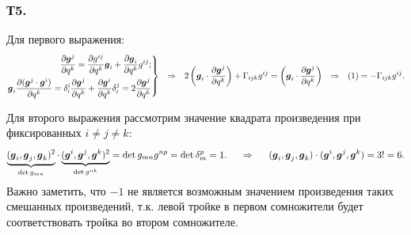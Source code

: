 \subsubsection*{Т5.}
Для первого выражения:
\begin{equation}
    \left.\begin{aligned}
        \frac{\partial \mbox{\boldmath $g$}^j}{\partial q^k} = \frac{\partial g^{ij}}{\partial q^k} \mbox{\boldmath $g$}_i + \frac{\partial \mbox{\boldmath $g$}_i}{\partial q^k} g^{ij}; \\ 
        \mbox{\boldmath $g$}_i \frac{\partial (\mbox{\boldmath $g$}^j \cdot \mbox{\boldmath $g$}^i)}{\partial q^k} = 
        \delta_i^i \frac{\partial \mbox{\boldmath $g$}^j}{\partial q^k} + \frac{\partial \mbox{\boldmath $g$}^i}{\partial q^k} \delta_i^j
        = 
        2 \frac{\partial \mbox{\boldmath $g$}^j}{\partial q^k}
    \end{aligned}\right\}
    \hspace{0.25cm} \Rightarrow \hspace{0.25cm} 
    2 \left(\mbox{\boldmath $g$}_i \cdot \frac{\partial \mbox{\boldmath $g$}^j}{\partial q^k} \right) + \Gamma_{ijk} g^{ij} = \left(\mbox{\boldmath $g$}_i  \cdot \frac{\partial \mbox{\boldmath $g$}^j}{\partial q^k} \right)
    \hspace{0.25cm} \Rightarrow \hspace{0.25cm} 
    (1) = - \Gamma_{ijk} g^{ij}.
\end{equation}

Для второго выражения рассмотрим значение квадрата произведения при фиксированных $i \neq j \neq k$:
$$
    \underbrace{(\mbox{\boldmath $g$}_i, \mbox{\boldmath $g$}_j, \mbox{\boldmath $g$}_k)^2}_{\det g_{mn}} \cdot 
    \underbrace{(\mbox{\boldmath $g$}^i, \mbox{\boldmath $g$}^j, \mbox{\boldmath $g$}^k)^2}_{\det g^{nk}} = \det g_{mn} g^{np} = \det \delta_m^p = 1.
    \hspace{0.5cm} \Rightarrow \hspace{0.5cm} 
    (\mbox{\boldmath $g$}_i, \mbox{\boldmath $g$}_j, \mbox{\boldmath $g$}_k) \cdot (\mbox{\boldmath $g$}^i, \mbox{\boldmath $g$}^j, \mbox{\boldmath $g$}^k) = 3! = 6.
$$
Важно заметить, что $-1$ не является возможным значением произведения таких смешанных произведений, т.к. левой тройке в первом сомножители будет соответствовать тройка во втором сомножителе.
